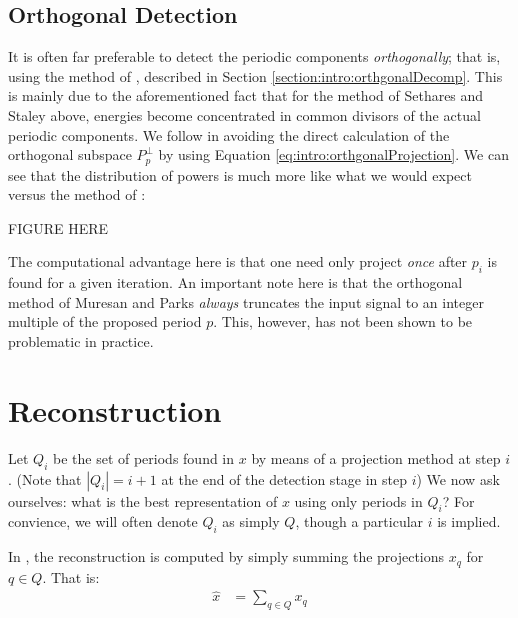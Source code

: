 
    \subsection{Orthogonal Detection}
    It is often far preferable to detect the periodic components \emph{orthogonally}; that is, using the method of \cite{muresan2003orthogonal}, described in Section \ref{section:intro:orthgonalDecomp}. This is mainly due to the aforementioned fact that for the method of Sethares and Staley above, energies become concentrated in common divisors of the actual periodic components. We follow \cite{muresan2003orthogonal} in avoiding the direct calculation of the orthogonal subspace $P_{p}^{\perp}$ by using Equation \eqref{eq:intro:orthgonalProjection}. We can see that the distribution of powers is much more like what we would expect versus the method of \cite{sethares1999periodicity}:

    FIGURE HERE

    The computational advantage here is that one need only project \emph{once} after $p_{i}$ is found for a given iteration. An important note here is that the orthogonal method of Muresan and Parks \emph{always} truncates the input signal to an integer multiple of the proposed period $p$. This, however, has not been shown to be problematic in practice.

\section{Reconstruction}
Let $Q_i$ be the set of periods found in $x$ by means of a projection method at step $i$. (Note that $|Q_i| = i + 1$ at the end of the detection stage in step $i$) We now ask ourselves: what is the best representation of $x$ using only periods in $Q_i$? For convience, we will often denote $Q_i$ as simply $Q$, though a particular $i$ is implied.

In \cite{sethares1999periodicity}, the reconstruction is computed by simply summing the projections $x_q$ for $q \in Q$. That is:
\begin{align}
    \hat{x} &= \sum_{q \in Q} x_q
\end{align}

